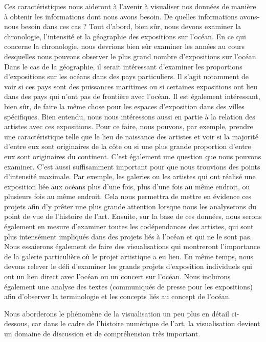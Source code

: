 \documentclass[a4paper, twoside, 12pt]{book}
\begin{document}
Ces caractéristiques nous aideront à l'avenir à visualiser nos données de manière à obtenir les informations dont nous avons besoin. De quelles informations avons-nous besoin dans ces cas ? Tout d'abord, bien sûr, nous devons examiner la chronologie, l'intensité et la géographie des expositions sur l'océan. En ce qui concerne la chronologie, nous devrions bien sûr examiner les années au cours desquelles nous pouvons observer le plus grand nombre d'expositions sur l'océan. Dans le cas de la géographie, il serait intéressant d'examiner les proportions d'expositions sur les océans dans des pays particuliers. Il s'agit notamment de voir si ces pays sont des puissances maritimes ou si certaines expositions ont lieu dans des pays qui n'ont pas de frontière avec l'océan. Il est également intéressant, bien sûr, de faire la même chose pour les espaces d'exposition dans des villes spécifiques. Bien entendu, nous nous intéressons aussi en partie à la relation des artistes avec ces expositions. Pour ce faire, nous pouvons, par exemple, prendre une caractéristique telle que le lieu de naissance des artistes et voir si la majorité d'entre eux sont originaires de la côte ou si une plus grande proportion d'entre eux sont originaires du continent. C'est également une question que nous pouvons examiner. C'est aussi suffisamment important pour que nous trouvions des points d'intensité maximale. Par exemple, les galeries ou les artistes qui ont réalisé une exposition liée aux océans plus d'une fois, plus d'une fois au même endroit, ou plusieurs fois au même endroit. Cela nous permettra de mettre en évidence ces projets afin d'y prêter une plus grande attention lorsque nous les analyserons du point de vue de l'histoire de l'art. Ensuite, sur la base de ces données, nous serons également en mesure d'examiner toutes les codépendances des artistes, qui sont plus intensément impliqués dans des projets liés à l'océan et qui ne le sont pas. Nous essaierons également de faire des visualisations qui montreront l'importance de la galerie particulière où le projet artistique a eu lieu. En même temps, nous devons relever le défi d'examiner les grands projets d'exposition individuels qui ont un lien direct avec l'océan ou un concert sur l'océan. Nous inclurons également une analyse des textes (communiqués de presse pour les expositions) afin d'observer la terminologie et les concepts liés au concept de l'océan. 

Nous aborderons le phénomène de la visualisation un peu plus en détail ci-dessous, car dans le cadre de l'histoire numérique de l'art, la visualisation devient un domaine de discussion et de compréhension très important. 
\end{document}
